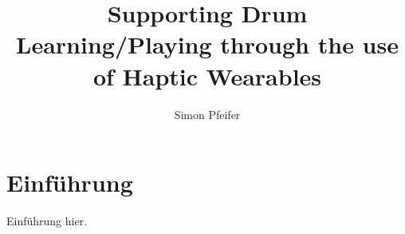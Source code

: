 \documentclass[ngerman,runningheads,a4paper]{llncs}
\begin{document}
\title{Supporting Drum Learning/Playing through the use of Haptic Wearables}
\author{Simon Pfeifer}
\maketitle
\begin{abstract}

\end{abstract}
\section{Einführung}
Einführung hier.
\end{document}
